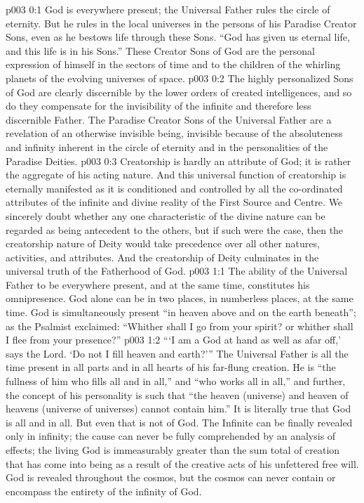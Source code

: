 \author{Divine Counsellor}
\vs p003 0:1 God is everywhere present; the Universal Father rules the circle of eternity. But he rules in the local universes in the persons of his Paradise Creator Sons, even as he bestows life through these Sons. “God has given us eternal life, and this life is in his Sons.” These Creator Sons of God are the personal expression of himself in the sectors of time and to the children of the whirling planets of the evolving universes of space.
\vs p003 0:2 The highly personalized Sons of God are clearly discernible by the lower orders of created intelligences, and so do they compensate for the invisibility of the infinite and therefore less discernible Father. The Paradise Creator Sons of the Universal Father are a revelation of an otherwise invisible being, invisible because of the absoluteness and infinity inherent in the circle of eternity and in the personalities of the Paradise Deities.
\vs p003 0:3 \pc Creatorship is hardly an attribute of God; it is rather the aggregate of his acting nature. And this universal function of creatorship is eternally manifested as it is conditioned and controlled by all the co\hyp{}ordinated attributes of the infinite and divine reality of the First Source and Centre. We sincerely doubt whether any one characteristic of the divine nature can be regarded as being antecedent to the others, but if such were the case, then the creatorship nature of Deity would take precedence over all other natures, activities, and attributes. And the creatorship of Deity culminates in the universal truth of the Fatherhood of God.
\vs p003 1:1 The ability of the Universal Father to be everywhere present, and at the same time, constitutes his omnipresence. God alone can be in two places, in numberless places, at the same time. God is simultaneously present “in heaven above and on the earth beneath”; as the Psalmist exclaimed: “Whither shall I go from your spirit? or whither shall I flee from your presence?”
\vs p003 1:2 “‘I am a God at hand as well as afar off,’ says the Lord. ‘Do not I fill heaven and earth?’” The Universal Father is all the time present in all parts and in all hearts of his far\hyp{}flung creation. He is “the fullness of him who fills all and in all,” and “who works all in all,” and further, the concept of his personality is such that “the heaven (universe) and heaven of heavens (universe of universes) cannot contain him.” It is literally true that God is all and in all. But even that is not  of God. The Infinite can be finally revealed only in infinity; the cause can never be fully comprehended by an analysis of effects; the living God is immeasurably greater than the sum total of creation that has come into being as a result of the creative acts of his unfettered free will. God is revealed throughout the cosmos, but the cosmos can never contain or encompass the entirety of the infinity of God.
